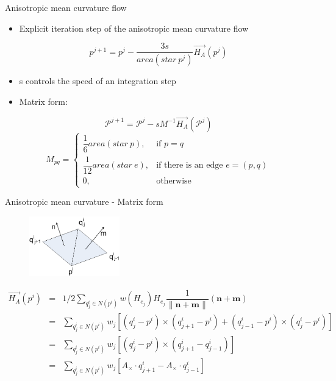 \documentclass{beamer}
\begin{document}
\begin{frame}{Anisotropic mean curvature flow}
\begin{itemize}
\item Explicit iteration step of the anisotropic mean curvature flow
\end{itemize}
\begin{equation*}
p^{j+1} = p^{j} - \dfrac{3s}{area(star\ p^j)}\vec{H_A}(p^j)
\end{equation*}
\begin{itemize}
\item s controls the speed of an integration step
\item Matrix form:
\end{itemize}
\begin{equation*}
\mathcal{P}^{j+1} = \mathcal{P}^j -sM^{-1}\vec{H_A}(\mathcal{P}^j)
\end{equation*}
\begin{equation*}
M_{pq} = 
\begin{cases} \dfrac{1}{6}area(star\ p), & \mbox{if } p=q \\ 
\dfrac{1}{12}area(star\ e), & \mbox{if there is an edge } e=(p, q) \\
0, & \mbox{otherwise} \end{cases}
\end{equation*}
\end{frame}

\begin{frame}{Anisotropic mean curvature - Matrix form}
\begin{figure}[htb]
\centering
\includegraphics[width=0.35\textwidth]{edge_normal.png}
\label{fig:normal}
\end{figure}
{\small
\begin{equation*}
\begin{array} {lcl} 
\vec{H_A}(p^i) & = & 1/2\sum\limits_{q_j^i \in N(p^i)}{w(H_{e_j})H_{e_j}\dfrac{1}{\|\mathbf{n}+\mathbf{m}\|}}(\mathbf{n}+\mathbf{m}) \\ 
			   & = & \sum\limits_{q_j^i \in N(p^i)}{w_j\left[ (q_j^i-p^i)\times (q^i_{j+1} - p^i) + (q^i_{j-1}-p^i) \times (q^i_j-p^i) \right] } \\
			   & = & \sum\limits_{q_j^i \in N(p^i)}{w_j\left[ (q_j^i-p^i)\times (q^i_{j+1} - q^i_{j-1}) \right] } \\
			   & = & \sum\limits_{q_j^i \in N(p^i)}{w_j\left[ A_{\times} \cdot q^i_{j+1} - A_{\times} \cdot q^i_{j-1} \right] } \\
\end{array}
\end{equation*}
}
\end{frame}
\end{document}
